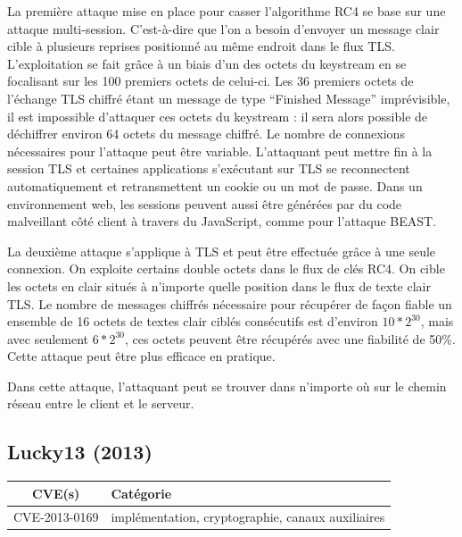 La première attaque mise en place pour casser l'algorithme RC4 se base sur une attaque multi-session. C'est-à-dire que l'on a besoin d'envoyer un message clair cible à plusieurs reprises positionné au même endroit dans le flux TLS. L'exploitation se fait grâce à un biais d'un des octets du keystream en se focalisant sur les 100 premiers octets de celui-ci. Les 36 premiers octets de l'échange TLS chiffré étant un message de type ``Finished Message'' imprévisible, il est impossible d'attaquer ces octets du keystream : il sera alors possible de déchiffrer environ 64 octets du message chiffré. Le nombre de connexions nécessaires pour l'attaque peut être variable. L'attaquant peut mettre fin à la session TLS et certaines applications s'exécutant sur TLS se reconnectent automatiquement et retransmettent un cookie ou un mot de passe. Dans un environnement web, les sessions peuvent aussi être générées par du code malveillant côté client à travers du JavaScript, comme pour l'attaque BEAST.

La deuxième attaque s'applique à TLS et peut être effectuée grâce à une seule connexion. On exploite certains double octets dans le flux de clés RC4. On cible les octets en clair situés à n'importe quelle position dans le flux de texte clair TLS. Le nombre de messages chiffrés nécessaire pour récupérer de façon fiable un ensemble de 16 octets de textes clair ciblés consécutifs est d'environ $10*2^{30}$, mais avec seulement $6*2^{30}$, ces octets peuvent être récupérés avec une fiabilité de 50\%. Cette attaque peut être plus efficace en pratique.

Dans cette attaque, l'attaquant peut se trouver dans n'importe où sur le chemin réseau entre le client et le serveur\cite{rc4}.




\subsection{Lucky13 (2013)}

\begin{tabularx}{0.96\textwidth}{|c|X|}
  \hline
  \textbf{CVE(s)} & \textbf{Catégorie} \\
  \hline
  CVE-2013-0169 & implémentation, cryptographie, canaux auxiliaires \\
  \hline
\end{tabularx}

